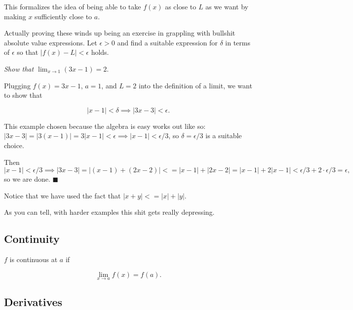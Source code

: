 \documentclass{article}
\begin{document}
This formalizes the idea of being able to take $f(x)$ as close to $L$ as we want
by making $x$ sufficiently close to $a$.

Actually proving these winds up being an exercise in grappling with bullshit
absolute value expressions. Let $\epsilon > 0$ and find a suitable expression
for $\delta$ in terms of $\epsilon$ so that $|f(x) -L| < \epsilon$ holds.

\begin{example} 

\emph{Show that $\lim_{x \to 1} (3x-1) = 2$}.

Plugging $f(x) = 3x-1$, $a = 1$, and $L = 2$ into the definition of a limit, we
want to show that 

\begin{equation}
|x - 1| < \delta \implies |3x - 3| < \epsilon.
\end{equation}

This example chosen because the algebra is easy works out like so: $|3x-3| =
|3(x-1)| = 3|x-1| < \epsilon \implies |x-1| < \epsilon/3$, so $\delta =
\epsilon/3$ is a suitable choice.

Then $|x - 1| < \epsilon/3 \implies |3x-3| = |(x - 1) + (2x-2)| <= |x-1| +
|2x-2| = |x-1| + 2|x-1| < \epsilon/3 + 2 \cdot \epsilon/3 = \epsilon,$ so we are
done. $\blacksquare$

Notice that we have used the fact that $|x + y| <= |x| + |y|$.

\end{example}

As you can tell, with harder examples this shit gets really depressing.

\subsection{Continuity}

\begin{definition}

$f$ is continuous at $a$ if

\begin{equation}
\lim_{x \to a} f(x) = f(a).
\end{equation}

\end{definition}

\subsection{Derivatives}
\end{document}
